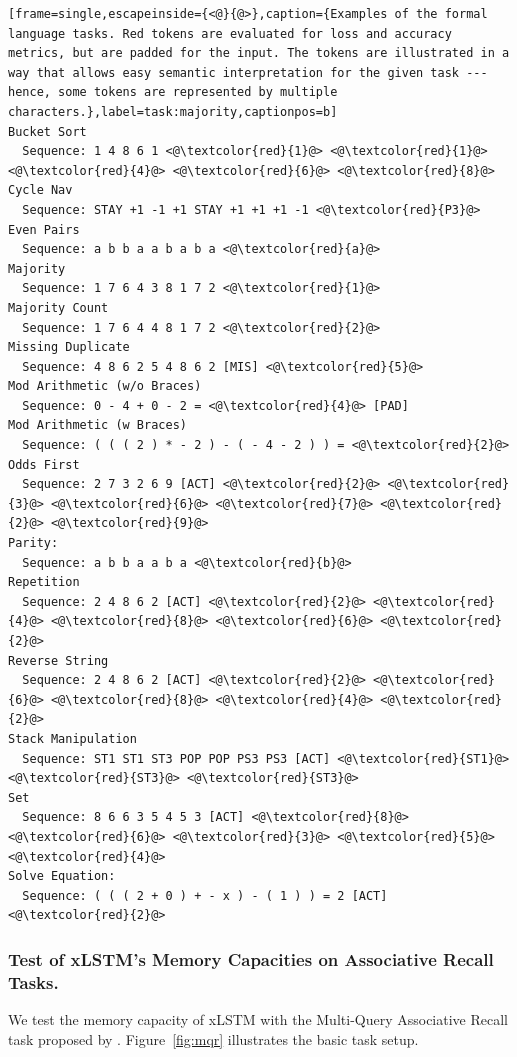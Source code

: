 \documentclass[dvipsnames]{article}
\begin{document}
\begin{appendix}
\clearpage

\begin{lstlisting}[frame=single,escapeinside={<@}{@>},caption={Examples of the formal language tasks. Red tokens are evaluated for loss and accuracy metrics, but are padded for the input. The tokens are illustrated in a way that allows easy semantic interpretation for the given task --- hence, some tokens are represented by multiple characters.},label=task:majority,captionpos=b]
Bucket Sort
  Sequence: 1 4 8 6 1 <@\textcolor{red}{1}@> <@\textcolor{red}{1}@> <@\textcolor{red}{4}@> <@\textcolor{red}{6}@> <@\textcolor{red}{8}@>
Cycle Nav
  Sequence: STAY +1 -1 +1 STAY +1 +1 +1 -1 <@\textcolor{red}{P3}@>
Even Pairs
  Sequence: a b b a a b a b a <@\textcolor{red}{a}@>
Majority
  Sequence: 1 7 6 4 3 8 1 7 2 <@\textcolor{red}{1}@>
Majority Count
  Sequence: 1 7 6 4 4 8 1 7 2 <@\textcolor{red}{2}@>
Missing Duplicate
  Sequence: 4 8 6 2 5 4 8 6 2 [MIS] <@\textcolor{red}{5}@>
Mod Arithmetic (w/o Braces)
  Sequence: 0 - 4 + 0 - 2 = <@\textcolor{red}{4}@> [PAD]
Mod Arithmetic (w Braces)
  Sequence: ( ( ( 2 ) * - 2 ) - ( - 4 - 2 ) ) = <@\textcolor{red}{2}@>
Odds First
  Sequence: 2 7 3 2 6 9 [ACT] <@\textcolor{red}{2}@> <@\textcolor{red}{3}@> <@\textcolor{red}{6}@> <@\textcolor{red}{7}@> <@\textcolor{red}{2}@> <@\textcolor{red}{9}@>
Parity:
  Sequence: a b b a a b a <@\textcolor{red}{b}@>
Repetition
  Sequence: 2 4 8 6 2 [ACT] <@\textcolor{red}{2}@> <@\textcolor{red}{4}@> <@\textcolor{red}{8}@> <@\textcolor{red}{6}@> <@\textcolor{red}{2}@>
Reverse String
  Sequence: 2 4 8 6 2 [ACT] <@\textcolor{red}{2}@> <@\textcolor{red}{6}@> <@\textcolor{red}{8}@> <@\textcolor{red}{4}@> <@\textcolor{red}{2}@>
Stack Manipulation
  Sequence: ST1 ST1 ST3 POP POP PS3 PS3 [ACT] <@\textcolor{red}{ST1}@> <@\textcolor{red}{ST3}@> <@\textcolor{red}{ST3}@>   
Set
  Sequence: 8 6 6 3 5 4 5 3 [ACT] <@\textcolor{red}{8}@> <@\textcolor{red}{6}@> <@\textcolor{red}{3}@> <@\textcolor{red}{5}@> <@\textcolor{red}{4}@>
Solve Equation:
  Sequence: ( ( ( 2 + 0 ) + - x ) - ( 1 ) ) = 2 [ACT] <@\textcolor{red}{2}@>
\end{lstlisting}

\subsubsection{Test of xLSTM's Memory Capacities on Associative Recall Tasks.}\label{sec:appExpSynthetic-mqar}
We test the memory capacity of xLSTM with the Multi-Query Associative Recall task proposed by \citet{Arora:23arxiv}.
Figure~\ref{fig:mqr} illustrates the basic task setup.


\end{appendix}
\end{document}
